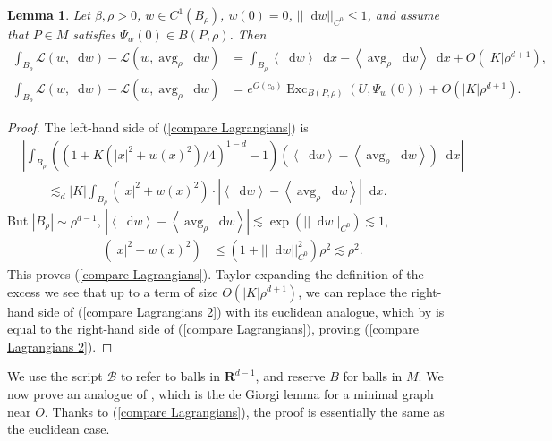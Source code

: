 \documentclass[reqno,11pt]{amsart}
\newcommand{\RR}{\mathbf{R}}
\DeclareMathOperator{\avg}{avg}
\DeclareMathOperator{\Exc}{Exc}
\newcommand*\dif{\mathop{}\!\mathrm{d}}
\newcommand{\Lagrange}{\mathscr L}
\def\Japan#1{\left \langle #1 \right \rangle}
\newtheorem{lemma}[theorem]{Lemma}
\theoremstyle{definition}
\numberwithin{equation}{section}
\begin{document}
\begin{lemma}
Let $\beta, \rho > 0$, $w \in C^1(B_\rho)$, $w(0) = 0$, $||\dif w||_{C^0} \leq 1$, and assume that $P \in M$ satisfies $\Psi_w(0) \in B(P, \rho)$. Then
\begin{align}
\int_{B_\rho} \Lagrange(w, \dif w) - \Lagrange(w, \avg_\rho \dif w) &= \int_{B_\rho} \Japan{\dif w} \dif x - \Japan{\avg_\rho \dif w} \dif x + O(|K| \rho^{d + 1}) \label{compare Lagrangians}, \\
\int_{B_\rho} \Lagrange(w, \dif w) - \Lagrange(w, \avg_\rho \dif w) &= e^{O(c_0)} \Exc_{B(P, \rho)} (U, \Psi_w(0)) + O(|K| \rho^{d + 1}). \label{compare Lagrangians 2}
\end{align}
\end{lemma}
\begin{proof}
The left-hand side of (\ref{compare Lagrangians}) is
\begin{align*}
&\left|\int_{B_\rho} ((1 + K(|x|^2 + w(x)^2)/4)^{1 - d} - 1)(\Japan{\dif w} - \Japan{\avg_\rho \dif w}) \dif x\right| \\
&\qquad \lesssim_d |K| \int_{B_\rho} (|x|^2 + w(x)^2) \cdot \left|\Japan{\dif w} - \Japan{\avg_\rho \dif w}\right| \dif x.
\end{align*}
But $|B_\rho| \sim \rho^{d - 1}$, $|\Japan{\dif w} - \Japan{\avg_\rho \dif w}| \lesssim \exp(||\dif w||_{C^0}) \lesssim 1$,
\begin{align*}
(|x|^2 + w(x)^2) &\leq (1 + ||\dif w||_{C^0}^2) \rho^2 \lesssim \rho^2.
\end{align*}
This proves (\ref{compare Lagrangians}). Taylor expanding the definition of the excess we see that up to a term of size $O(|K| \rho^{d + 1})$, we can replace the right-hand side of (\ref{compare Lagrangians 2}) with its euclidean analogue, which by \cite[pg83]{Giusti77} is equal to the right-hand side of (\ref{compare Lagrangians}), proving (\ref{compare Lagrangians 2}).
\end{proof}

We use the script $\mathscr B$ to refer to balls in $\RR^{d - 1}$, and reserve $B$ for balls in $M$.
We now prove an analogue of \cite[Lemma 6.3]{Giusti77}, which is the de Giorgi lemma for a minimal graph near $O$.
Thanks to (\ref{compare Lagrangians}), the proof is essentially the same as the euclidean case.
\end{document}
